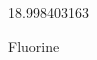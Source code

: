 \documentclass[12pt]{article}
\begin{document}
\hfill{}
\vfill
\begin{center}
  {\fontsize{50}{60}
  }

  \vspace{1em}

  18.998403163

Fluorine
\end{center}
\vfill
\end{document}
